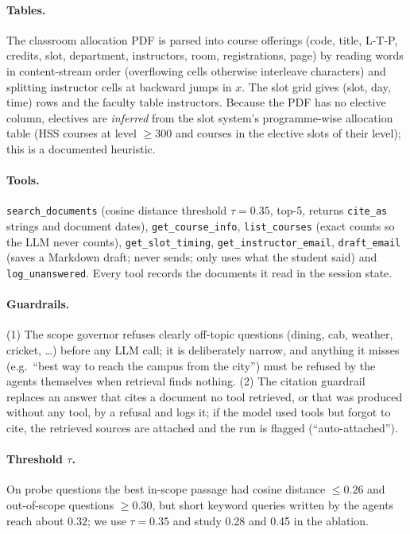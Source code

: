 \documentclass[11pt,a4paper]{article}
\begin{document}
\paragraph{Tables.} The classroom allocation PDF is parsed into \numCourses{} course offerings
(code, title, L-T-P, credits, slot, department, instructors, room, registrations, page) by reading words in
content-stream order (overflowing cells otherwise interleave characters) and splitting instructor cells at
backward jumps in $x$. The slot grid gives \numSlotRows{} (slot, day, time) rows and the faculty table
\numFaculty{} instructors. Because the PDF has no elective column, electives are \emph{inferred} from the
slot system's programme-wise allocation table (HSS courses at level $\ge$300 and courses in the elective
slots of their level); this is a documented heuristic.

\paragraph{Tools.} \texttt{search\_documents} (cosine distance threshold $\tau=0.35$, top-5, returns
\texttt{cite\_as} strings and document dates), \texttt{get\_course\_info}, \texttt{list\_courses} (exact
counts so the LLM never counts), \texttt{get\_slot\_timing}, \texttt{get\_instructor\_email},
\texttt{draft\_email} (saves a Markdown draft; never sends; only uses what the student said) and
\texttt{log\_unanswered}. Every tool records the documents it read in the session state.

\paragraph{Guardrails.} (1) The scope governor refuses clearly off-topic questions (dining, cab, weather,
cricket, \dots) before any LLM call; it is deliberately narrow, and anything it misses (e.g.\ ``best way to
reach the campus from the city'') must be refused by the agents themselves when retrieval finds nothing.
(2) The citation guardrail replaces an answer that cites a document no tool retrieved, or that was produced
without any tool, by a refusal and logs it; if the model used tools but forgot to cite, the retrieved
sources are attached and the run is flagged (``auto-attached'').

\paragraph{Threshold $\tau$.} On probe questions the best in-scope passage had cosine distance
$\le 0.26$ and out-of-scope questions $\ge 0.30$, but short keyword queries written by the agents reach
about $0.32$; we use $\tau=0.35$ and study 0.28 and 0.45 in the ablation.
\end{document}
